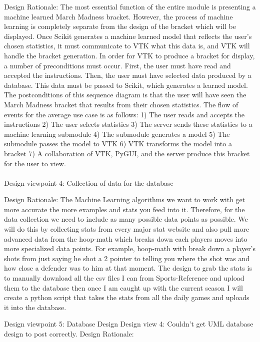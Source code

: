 \documentclass[journal,onecolumn]{IEEEtran}
\begin{document}
{\large Design Rationale:}
The most essential function of the entire module is presenting a machine learned March Madness bracket. However, the process of machine learning is completely separate from the design of the bracket which will be displayed. Once Scikit generates a machine learned model that reflects the user's chosen statistics, it must communicate to VTK what this data is, and VTK will handle the bracket generation. In order for VTK to produce a bracket for display, a number of preconditions must occur. First, the user must have read and accepted the instructions. Then, the user must have selected data produced by a database. This data must be passed to Scikit, which generates a learned model. The postconditions of this sequence diagram is that the user will have seen the March Madness bracket that results from their chosen statistics. The flow of events for the average use case is as follows: 1) The user reads and accepts the instructions 2) The user selects statistics 3) The server sends these statistics to a machine learning submodule 4) The submodule generates a model 5) The submodule passes the model to VTK 6) VTK transforms the model into a bracket 7) A collaboration of VTK, PyGUI, and the server produce this bracket for the user to view.
\\
\\

{\large Design viewpoint 4: Collection of data for the database}

{\large Design Rationale:}
The Machine Learning algorithms we want to work with get more accurate the more examples and stats you feed into it. Therefore, for the data collection we need to include as many possible data points as possible. We will do this by collecting stats from every major stat website and also pull more advanced data from the hoop-math which breaks down each players moves into more specialized data points. For example, hoop-math with break down a player’s shots from just saying he shot a 2 pointer to telling you where the shot was and how close a defender was to him at that moment. The design to grab the stats is to manually download all the csv files I can from Sports-Reference and upload them to the database then once I am caught up with the current season I will create a python script that takes the stats from all the daily games and uploads it into the database. 


{\large Design viewpoint 5: Database Design}
Design view 4:
Couldn’t get UML database design to post correctly.
{\large Design Rationale:}
\end{document}
